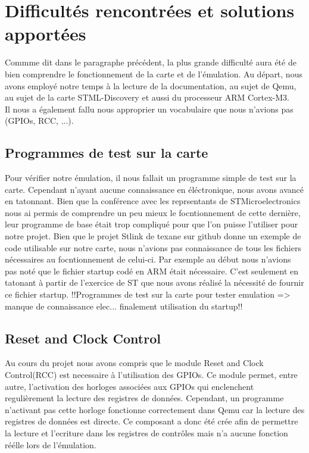 \documentclass{article}
\begin{document}
\section{Difficultés rencontrées et solutions apportées}
	Commme dit dans le paragraphe précédent, la plus grande difficulté aura été de bien comprendre le fonctionnement de la carte et de l'émulation.
	Au départ, nous avons employé notre temps à la lecture de la documentation, au sujet de Qemu, au sujet de la carte STML-Discovery et aussi du 
	processeur ARM Cortex-M3. \\
	Il nous a également fallu nous approprier un vocabulaire que nous n'avions pas (GPIOs, RCC, ...).
	
	
	\subsection{Programmes de test sur la carte}
		Pour vérifier notre émulation, il nous fallait un programme simple de test sur la carte. Cependant n'ayant aucune connaissance en
		éléctronique, nous avons avancé en tatonnant. Bien que la conférence avec les reprsentants de STMicroelectronics nous ai permis
		de comprendre un peu mieux le focntionnement de cette dernière, leur programme de base était trop compliqué pour que l'on puisse
		l'utiliser pour notre projet.
		Bien que le projet Stlink de texane sur github donne un exemple de code utilisable sur notre carte, nous n'avions pas connaissance 
		de tous les fichiers nécessaires au focntionnement de celui-ci. Par exemple au début nous n'avions pas noté que le fichier startup 
		codé en ARM était nécessaire. C'est seulement en tatonant à partir de l'exercice de ST que nous avons réalisé la nécessité de fournir
		ce fichier startup. 
		!!Programmes de test sur la carte pour tester emulation => manque de connaissance elec... finalement utilisation du startup!!
		
	\subsection{Reset and Clock Control}\label{RCC}
		Au cours du projet nous avons compris que le module Reset and Clock Control(RCC) est necessaire à l'utilisation des GPIOs. 
		Ce module permet, entre autre, l'activation des horloges associées aux GPIOs qui enclenchent regulièrement la lecture des registres de 
		données. Cependant, un programme n'activant pas cette horloge fonctionne correctement dans Qemu car la lecture des registres 
		de données est directe. Ce composant a donc été crée afin de permettre la lecture et l'ecriture dans les registres de contrôles mais 
		n'a aucune fonction réélle lors de l'émulation.
	
\end{document}
